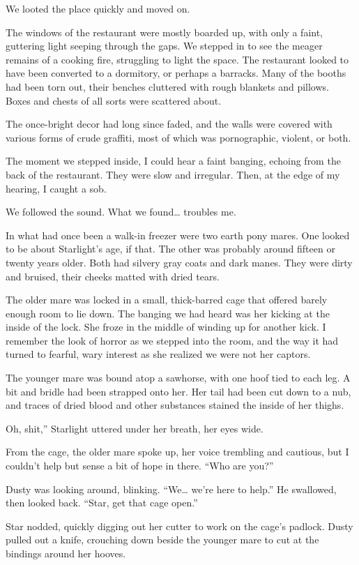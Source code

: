 We looted the place quickly and moved on.

The windows of the restaurant were mostly boarded up, with only a faint, guttering light seeping through the gaps. We stepped in to see the meager remains of a cooking fire, struggling to light the space. The restaurant looked to have been converted to a dormitory, or perhaps a barracks. Many of the booths had been torn out, their benches cluttered with rough blankets and pillows. Boxes and chests of all sorts were scattered about.

The once-bright decor had long since faded, and the walls were covered with various forms of crude graffiti, most of which was pornographic, violent, or both.

The moment we stepped inside, I could hear a faint banging, echoing from the back of the restaurant. They were slow and irregular. Then, at the edge of my hearing, I caught a sob.

We followed the sound. What we found… troubles me.

In what had once been a walk-in freezer were two earth pony mares. One looked to be about Starlight’s age, if that. The other was probably around fifteen or twenty years older. Both had silvery gray coats and dark manes. They were dirty and bruised, their cheeks matted with dried tears.

The older mare was locked in a small, thick-barred cage that offered barely enough room to lie down. The banging we had heard was her kicking at the inside of the lock. She froze in the middle of winding up for another kick. I remember the look of horror as we stepped into the room, and the way it had turned to fearful, wary interest as she realized we were not her captors.

The younger mare was bound atop a sawhorse, with one hoof tied to each leg. A bit and bridle had been strapped onto her. Her tail had been cut down to a nub, and traces of dried blood and other substances stained the inside of her thighs.

\leavevmode{}Oh, shit,” Starlight uttered under her breath, her eyes wide.

From the cage, the older mare spoke up, her voice trembling and cautious, but I couldn’t help but sense a bit of hope in there. “Who are you?”

Dusty was looking around, blinking. “We… we’re here to help.” He swallowed, then looked back. “Star, get that cage open.”

Star nodded, quickly digging out her cutter to work on the cage’s padlock. Dusty pulled out a knife, crouching down beside the younger mare to cut at the bindings around her hooves.

